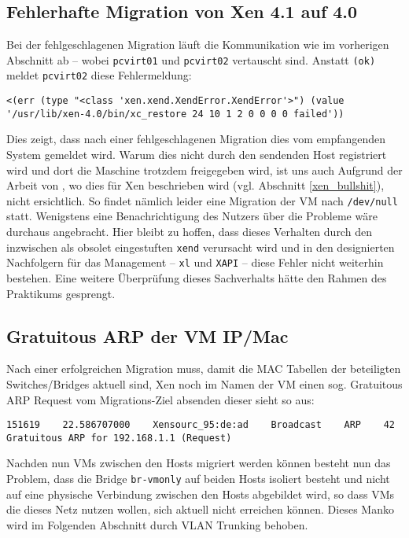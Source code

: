 \subsection{Fehlerhafte Migration von Xen 4.1 auf 4.0}
Bei der fehlgeschlagenen Migration läuft die Kommunikation wie im vorherigen Abschnitt ab -- wobei \verb#pcvirt01# und \verb#pcvirt02# vertauscht sind. Anstatt \verb#(ok)# meldet \verb#pcvirt02# diese Fehlermeldung:
\setupVerbatimOut
\begin{verbatim}
<(err (type "<class 'xen.xend.XendError.XendError'>") (value '/usr/lib/xen-4.0/bin/xc_restore 24 10 1 2 0 0 0 0 failed'))
\end{verbatim}

Dies zeigt, dass nach einer fehlgeschlagenen Migration dies vom empfangenden System gemeldet wird. Warum dies nicht durch den sendenden Host registriert wird und dort die Maschine trotzdem freigegeben wird, ist uns auch Aufgrund der Arbeit von \cite{clark2005live}, wo dies für Xen beschrieben wird (vgl. Abschnitt \ref{xen_bullshit}), nicht ersichtlich. 
So findet nämlich leider eine Migration der VM nach \verb#/dev/null# statt. Wenigstens eine Benachrichtigung des Nutzers über die Probleme wäre durchaus angebracht. Hier bleibt zu hoffen, dass dieses Verhalten durch den inzwischen als obsolet eingestuften \verb#xend# verursacht wird und in den designierten Nachfolgern für das Management -- \verb#xl# und \verb#XAPI# -- diese Fehler nicht weiterhin bestehen. Eine weitere Überprüfung dieses Sachverhalts hätte den Rahmen des Praktikums gesprengt.

\subsection{Gratuitous ARP der VM IP/Mac}\label{Gratuitous}

Nach einer erfolgreichen Migration muss, damit die MAC Tabellen der beteiligten Switches/Bridges aktuell sind, Xen noch im Namen der VM einen sog. Gratuitous ARP Request vom Migrations-Ziel absenden dieser sieht so aus:

\setupVerbatimOut
\begin{verbatim}
151619    22.586707000    Xensourc_95:de:ad    Broadcast    ARP    42    Gratuitous ARP for 192.168.1.1 (Request)
\end{verbatim}

Nachden nun VMs zwischen den Hosts migriert werden können besteht nun das Problem, dass die Bridge \verb#br-vmonly# auf beiden Hosts isoliert besteht und nicht auf eine physische Verbindung zwischen den Hosts abgebildet wird, so dass VMs die dieses Netz nutzen wollen, sich aktuell nicht erreichen können. Dieses Manko wird im Folgenden Abschnitt durch VLAN Trunking behoben.

